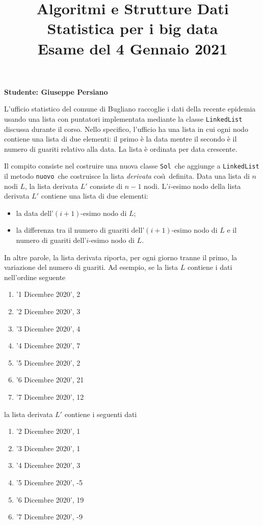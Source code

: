 \documentclass{amsart}
\begin{document}
\title{Algoritmi e Strutture Dati\\
Statistica per i big data\\
Esame del 4 Gennaio 2021
}


\newcommand{\NomeStudente}{Giuseppe Persiano}
\newcommand{\nomeClasse}{{\tt{Sol}}}
\newcommand{\nomeMetodo}{{\tt{nuovo}}}
\newcommand{\oraconsegna}{10:35}
\newcommand{\dataoggi}{4 Gennaio, 2021}


\maketitle

\hfill{{\bf Studente: \NomeStudente}}

\smallskip
L'ufficio statistico del comune di Bugliano raccoglie i dati della
recente epidemia usando una lista con puntatori implementata mediante la 
classe {\tt{LinkedList}} discussa durante il corso.
Nello specifico, l'ufficio ha una lista in cui ogni nodo contiene una
lista di due elementi: il primo \`e la data mentre il secondo \`e il
numero di guariti relativo alla data.
La lista \`e ordinata per data crescente. 

Il compito consiste nel costruire una nuova classe \nomeClasse\ che 
aggiunge a {\tt{LinkedList}} il metodo \nomeMetodo\
che costruisce la lista {\em derivata} cos\`\i\ definita.
Data una lista di $n$ nodi $L$, la lista derivata $L'$ consiste di $n-1$
nodi. L'$i$-esimo nodo della lista derivata $L'$ contiene una lista
di due elementi:
\begin{itemize}
\item la data dell'$(i+1)$-esimo nodo di $L$;
\item la differenza tra il numero di guariti dell'$(i+1)$-esimo nodo di $L$
e il numero di guariti dell'$i$-esimo nodo di $L$.
\end{itemize}
In altre parole, la lista derivata riporta, per ogni giorno
tranne il primo, la variazione del numero di guariti.
Ad esempio, 
se la lista $L$ contiene i dati nell'ordine seguente
\begin{enumerate}
\item '1 Dicembre 2020', 2
\item '2 Dicembre 2020', 3
\item '3 Dicembre 2020', 4
\item '4 Dicembre 2020', 7
\item '5 Dicembre 2020', 2
\item '6 Dicembre 2020', 21
\item '7 Dicembre 2020', 12
\end{enumerate}
la lista derivata $L'$ contiene i seguenti dati
\begin{enumerate}
\item '2 Dicembre 2020', 1
\item '3 Dicembre 2020', 1
\item '4 Dicembre 2020', 3
\item '5 Dicembre 2020', -5
\item '6 Dicembre 2020', 19
\item '7 Dicembre 2020', -9
\end{enumerate}
\end{document}
